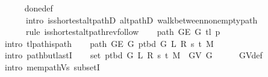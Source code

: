 \begin{isabellebody}
\ \ \ \ \isamarkupfalse%
\ done{\isacharunderscore}{\kern0pt}{}{\isacharunderscore}{\kern0pt}def\isanewline
\ \ \ \ \isamarkupfalse%
\isanewline
\ \ \ \ \ \ {\isacharparenleft}{\kern0pt}intro\ is{\isacharunderscore}{\kern0pt}shortest{\isacharunderscore}{\kern0pt}alt{\isacharunderscore}{\kern0pt}pathD{\isacharparenleft}{\kern0pt}{}{\isacharparenright}{\kern0pt}\ alt{\isacharunderscore}{\kern0pt}pathD{\isacharparenleft}{\kern0pt}{}{\isacharparenright}{\kern0pt}\ walk{\isacharunderscore}{\kern0pt}between{\isacharunderscore}{\kern0pt}nonempty{\isacharunderscore}{\kern0pt}path{\isacharparenleft}{\kern0pt}{}{\isacharparenright}{\kern0pt}{\isacharparenright}{\kern0pt}\isanewline
\ \ \ \ \ \ {\isacharparenleft}{\kern0pt}rule\ is{\isacharunderscore}{\kern0pt}shortest{\isacharunderscore}{\kern0pt}alt{\isacharunderscore}{\kern0pt}path{\isacharunderscore}{\kern0pt}rev{\isacharunderscore}{\kern0pt}follow{\isacharparenright}{\kern0pt}\isanewline
\ \ \isamarkupfalse%
\ {\isachardoublequoteopen}path\ {\isacharparenleft}{\kern0pt}G{\isachardot}{\kern0pt}E\ {\isacharquery}{\kern0pt}G{\isacharparenright}{\kern0pt}\ {\isacharparenleft}{\kern0pt}tl\ {\isacharquery}{\kern0pt}p{\isacharparenright}{\kern0pt}{\isachardoublequoteclose}\isanewline
\ \ \ \ \isamarkupfalse%
\ {\isacharparenleft}{\kern0pt}intro\ tl{\isacharunderscore}{\kern0pt}path{\isacharunderscore}{\kern0pt}is{\isacharunderscore}{\kern0pt}path{\isacharparenright}{\kern0pt}\isanewline
\ \ \isamarkupfalse%
\ {\isachardoublequoteopen}path\ {\isacharparenleft}{\kern0pt}G{\isachardot}{\kern0pt}E\ {\isacharquery}{\kern0pt}G{\isacharparenright}{\kern0pt}\ {\isacharparenleft}{\kern0pt}p{\isacharunderscore}{\kern0pt}tbd\ G\ L\ R\ s\ t\ M{\isacharparenright}{\kern0pt}{\isachardoublequoteclose}\isanewline
\ \ \ \ \isamarkupfalse%
\ {\isacharparenleft}{\kern0pt}intro\ path{\isacharunderscore}{\kern0pt}butlastI{\isacharparenright}{\kern0pt}\isanewline
\ \ \isamarkupfalse%
\ {\isachardoublequoteopen}set\ {\isacharparenleft}{\kern0pt}p{\isacharunderscore}{\kern0pt}tbd\ G\ L\ R\ s\ t\ M{\isacharparenright}{\kern0pt}\ {\isasymsubseteq}\ G{\isachardot}{\kern0pt}V\ {\isacharquery}{\kern0pt}G{\isachardoublequoteclose}\isanewline
\ \ \ \ \isamarkupfalse%
\ G{\isachardot}{\kern0pt}V{\isacharunderscore}{\kern0pt}def\isanewline
\ \ \ \ \isamarkupfalse%
\ {\isacharparenleft}{\kern0pt}intro\ mem{\isacharunderscore}{\kern0pt}path{\isacharunderscore}{\kern0pt}Vs\ subsetI{\isacharparenright}{\kern0pt}\isanewline

\end{isabellebody}
